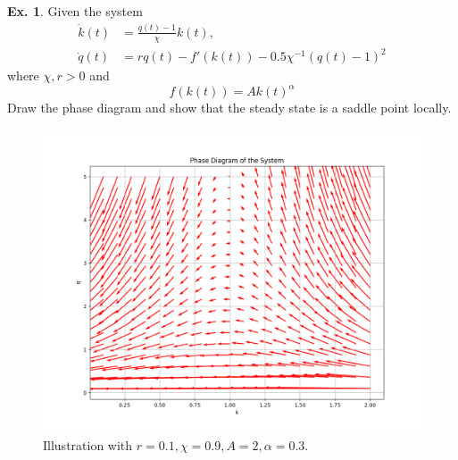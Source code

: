 \documentclass[11pt,a4paper]{book}
\theoremstyle{definition}\newtheorem{definition}{Definition}
\theoremstyle{definition}\newtheorem{fact}{Fact}
\theoremstyle{definition}\newtheorem{remark}{Remark}
\theoremstyle{definition}\newtheorem{ex}{Ex.}
\theoremstyle{definition}\newtheorem{project}{Project}
\theoremstyle{definition}\newtheorem{problem}{Problem}
\theoremstyle{definition}\newtheorem{example}{Example}
\numberwithin{theorem}{section}
\numberwithin{corollary}{chapter}
\numberwithin{assumption}{chapter}
\numberwithin{definition}{chapter}
\numberwithin{prop}{chapter}
\numberwithin{notation}{chapter}
\numberwithin{problem}{chapter}
\numberwithin{example}{chapter}
\numberwithin{fact}{chapter}
\numberwithin{ex}{chapter}
\begin{document}
	\begin{ex}
		Given the system
		\begin{align*}
			\dot{k}(t) &= \frac{q(t) - 1}{\chi} k(t), \\
			\dot{q}(t) &= r q(t) - f'(k(t)) - 0.5 \chi^{-1} (q(t)-1)^2
		\end{align*}
		where $\chi, r > 0$ and 
		$$
			f(k(t)) = A k(t)^\alpha
		$$
		Draw the phase diagram and show that the steady state is a saddle point locally.
		\begin{figure}[ht]
			\centering
			\includegraphics[scale=0.35]{figs/phase_diagram2.png}
			\caption{Illustration with $r=0.1, \chi = 0.9, A = 2, \alpha = 0.3$.}
		\end{figure}
	\end{ex}
	
	
\end{document}
